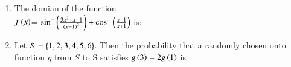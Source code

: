 \documentclass[journal]{IEEEtran}
\begin{document}
\begin{enumerate}[start=1]
\begin{enumerate}
\end{enumerate}
\begin{enumerate}
\end{enumerate}
\item %
The domian of the function \\
$f\left(x\right)$= $\sin ^- \left(\frac{3x^2+x-1}{\left(x-1\right)^2}\right)+\cos ^- \left(\frac{x-1}{x+1}\right)$ is:
\begin{enumerate}
\end{enumerate}
\begin{enumerate}
\end{enumerate}
\item %
Let $S= \left\{1,2,3,4,5,6\right\}$. Then the probability that a randomly chosen onto function $g$ from $S$ to S satisfies $g\left(3\right)=2g\left(1\right)$ is :
\begin{enumerate}
\end{enumerate}
\begin{enumerate}
\end{enumerate}

\end{enumerate}
\end{document}
